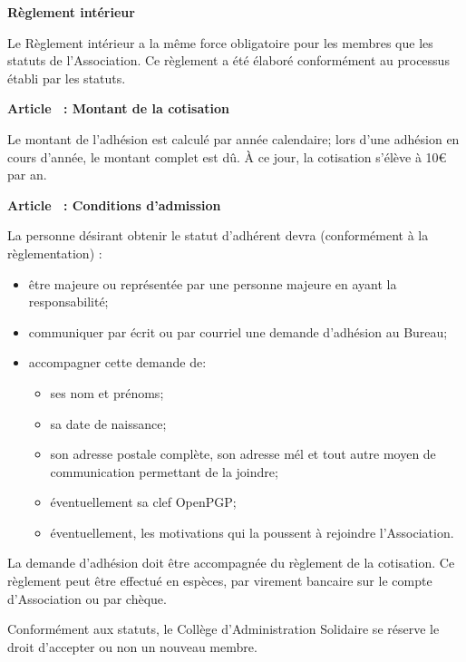 \documentclass [11pt]{article}
\renewcommand {\section}[1]{\stepcounter {section}%
{\vspace {1em}\noindent\Large \bf Article \thesection\ : #1 \par}}
\begin{document}
\begin {center}
\bf \huge {Règlement intérieur}
\end {center}

Le Règlement intérieur a la même force obligatoire pour les membres que les
statuts de l'Association. Ce règlement a été élaboré conformément au
processus établi par les statuts.


\section {Montant de la cotisation}

Le montant de l'adhésion est calculé par année calendaire; lors d'une
adhésion en cours d'année, le montant complet est dû.
À ce jour, la cotisation s'élève à 10€ par an.


\section {Conditions d'admission}

La personne désirant obtenir le statut d'adhérent devra (conformément à la
règlementation) :
\begin {itemize}
\item
être majeure ou représentée par une personne majeure en ayant la
responsabilité;
\item
communiquer par écrit ou par courriel une demande d'adhésion au Bureau;
\item
accompagner cette demande de:
\begin {itemize}
\item
ses nom et prénoms;
\item
sa date de naissance;
\item
son adresse postale complète, son adresse mél et tout autre moyen de
communication permettant de la joindre;
\item
éventuellement sa clef OpenPGP;
\item
éventuellement, les motivations qui la poussent à rejoindre l'Association.
\end {itemize}
\end {itemize}

La demande d'adhésion doit être accompagnée du règlement de la cotisation.
Ce règlement peut être effectué en espèces, par virement bancaire sur le
compte d'Association ou par chèque.

Conformément aux statuts, le Collège d'Administration Solidaire se réserve
le droit d'accepter ou non un nouveau membre.
\end{document}
